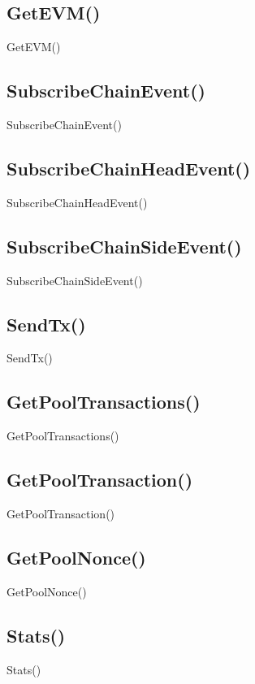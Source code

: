 \documentclass[letterpaper,10pt,english]{sphinxmanual}
\begin{document}
\subsection{GetEVM()}
\label{\detokenize{topics/implementation:getevm}}
GetEVM()


\subsection{SubscribeChainEvent()}
\label{\detokenize{topics/implementation:subscribechainevent}}
SubscribeChainEvent()


\subsection{SubscribeChainHeadEvent()}
\label{\detokenize{topics/implementation:subscribechainheadevent}}
SubscribeChainHeadEvent()


\subsection{SubscribeChainSideEvent()}
\label{\detokenize{topics/implementation:subscribechainsideevent}}
SubscribeChainSideEvent()


\subsection{SendTx()}
\label{\detokenize{topics/implementation:sendtx}}
SendTx()


\subsection{GetPoolTransactions()}
\label{\detokenize{topics/implementation:getpooltransactions}}
GetPoolTransactions()


\subsection{GetPoolTransaction()}
\label{\detokenize{topics/implementation:getpooltransaction}}
GetPoolTransaction()


\subsection{GetPoolNonce()}
\label{\detokenize{topics/implementation:getpoolnonce}}
GetPoolNonce()


\subsection{Stats()}
\label{\detokenize{topics/implementation:stats}}
Stats()
\end{document}
